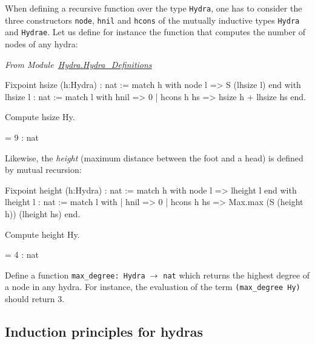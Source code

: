 \documentclass[a4paper]{book}
\begin{document}
When defining a recursive function over the type \texttt{Hydra}, one has to consider the three constructors 
\texttt{node}, \texttt{hnil} and \texttt{hcons} of the mutually inductive types \texttt{Hydra} and \texttt{Hydrae}. 
Let us define for instance the function that  computes the number of nodes of any hydra:

\vspace{4pt}
\emph{From Module~\href{../src/html/hydras.Hydra.Hydra_Definitions.html}{Hydra.Hydra\_Definitions}}


\begin{Coqsrc}
Fixpoint hsize (h:Hydra) : nat :=
  match h with node l => S (lhsize l)
  end
with lhsize l : nat :=
  match l with hnil => 0
            | hcons h hs => hsize h + lhsize hs 
  end.

 Compute hsize Hy.
\end{Coqsrc}

\begin{Coqanswer}
 = 9
     : nat 
\end{Coqanswer}


Likewise, the \emph{height} (maximum distance between the foot and a head) 
is defined by mutual recursion:

\begin{Coqsrc}
Fixpoint height  (h:Hydra) : nat :=
  match h with node l => lheight l
  end
with lheight l : nat :=
  match l with 
  | hnil => 0
  | hcons h hs => Max.max (S (height h)) (lheight hs)
  end.
\end{Coqsrc}

\begin{Coqsrc}
Compute height Hy.
\end{Coqsrc}

\begin{Coqanswer}
 = 4
     : nat  
\end{Coqanswer}


\begin{exercise}
Define a function \texttt{max\_degree: Hydra $\mbox{$\rightarrow$}$ nat} which  returns the highest degree of a node in any hydra. For instance, the evaluation of the term \texttt{(max\_degree Hy)} should return $3$.
\end{exercise}

\subsection{Induction principles for hydras}
\label{sec:orgheadline42}
\end{document}
